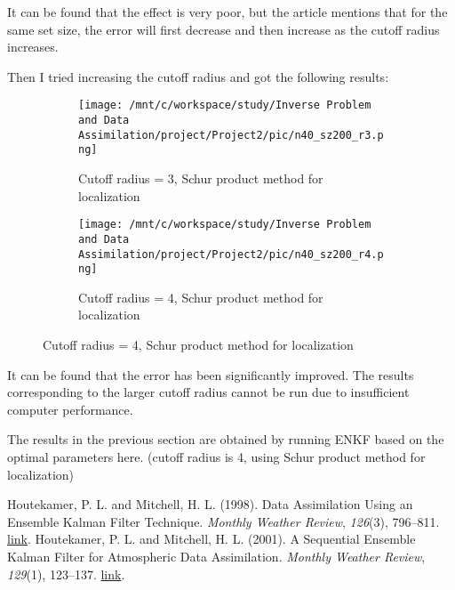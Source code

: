 \documentclass[11pt,reqno]{amsart}
\begin{document}
It can be found that the effect is very poor, but the article mentions that for the same set size, the error will first decrease and then increase as the cutoff radius increases.

Then I tried increasing the cutoff radius and got the following results:

\begin{figure}[H] %
  \begin{subfigure}[h]{0.45\textwidth}
      \centering
      \texttt{[image: /mnt/c/workspace/study/Inverse Problem and Data Assimilation/project/Project2/pic/n40\_sz200\_r3.png]} %
  \caption{Cutoff radius = 3, Schur product method for localization}
  \end{subfigure}
  \hfill
  \begin{subfigure}[h]{0.45\textwidth}
      \centering
      \texttt{[image: /mnt/c/workspace/study/Inverse Problem and Data Assimilation/project/Project2/pic/n40\_sz200\_r4.png]} %
  \caption{Cutoff radius = 4, Schur product method for localization}
  \end{subfigure}
\end{figure}
It can be found that the error has been significantly improved. The results corresponding to the larger cutoff radius cannot be run due to insufficient computer performance.

The results in the previous section are obtained by running ENKF based on the optimal parameters here. (cutoff radius is 4, using Schur product method for localization)
\begin{thebibliography}{9}
  Houtekamer, P. L. and Mitchell, H. L. (1998). 
  Data Assimilation Using an Ensemble Kalman Filter Technique. 
  \textit{Monthly Weather Review}, \textit{126}(3), 796--811. 
  \href{https://journals.ametsoc.org/view/journals/mwre/126/3/1520-0493_1998_126_0796_dauaek_2.0.co_2.xml}{link}.
  Houtekamer, P. L. and Mitchell, H. L. (2001). 
  A Sequential Ensemble Kalman Filter for Atmospheric Data Assimilation. 
  \textit{Monthly Weather Review}, \textit{129}(1), 123--137. 
  \href{https://journals.ametsoc.org/view/journals/mwre/129/1/1520-0493_2001_129_0123_asekff_2.0.co_2.xml}{link}.
    
\end{thebibliography}
  
\end{document}
